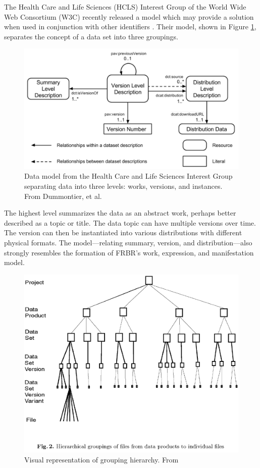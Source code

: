 The Health Care and Life Sciences (HCLS) Interest Group of the World Wide Web Consortium (W3C) recently released a model which may provide a solution when used in conjunction with other identifiers \cite{Dummontier2016}.
Their model, shown in Figure \ref{HCLSModel}, separates the concept of a data set into three groupings.
\begin{figure}%
	\centering
	\includegraphics[scale=0.35]{figures/HCLSModel.png}
	\caption[Data model from the Health Care and Life Sciences Interest Group separating data into three levels: works, versions, and instances.]{Data model from the Health Care and Life Sciences Interest Group separating data into three levels: works, versions, and instances.  From Dummontier, et al. \cite{Dummontier2016}}
	\label{HCLSModel}
\end{figure}
The highest level summarizes the data as an abstract work, perhaps better described as a topic or title.
The data topic can have multiple versions over time.
The version can then be instantiated into various distributions with different physical formats.
The model---relating summary, version, and distribution---also strongly resembles the formation of FRBR's work, expression, and manifestation model.

\begin{figure}
	\centering
	\includegraphics[scale=0.50]{figures/hierarchy.png}
	\caption[Visual representation of grouping hierarchy.]{Visual representation of grouping hierarchy.  From \cite{Barkstrom2003}}
	\label{hierarchy}
\end{figure}

